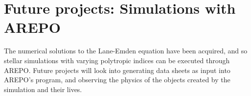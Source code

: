 \documentclass[linenumbers,trackchanges]{aastex701}
\begin{document}
\section{Future projects: Simulations with AREPO}
The numerical solutions to the Lane-Emden equation have been acquired, and so stellar simulations with varying polytropic indices can be executed through AREPO. Future projects will look into generating data sheets as input into AREPO's program, and observing the physics of the objects created by the simulation and their lives.

\end{document}
